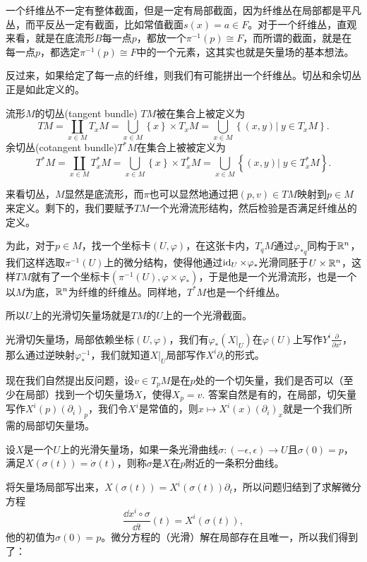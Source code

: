 一个纤维丛不一定有整体截面，但是一定有局部截面，因为纤维丛在局部都是平凡丛，而平反丛一定有截面，比如常值截面$s(x)=a\in F$。对于一个纤维丛，直观来看，就是在底流形$B$每一点$p$，都放一个$\pi^{-1}(p)\cong F$，而所谓的截面，就是在每一点$p$，都选定$\pi^{-1}(p)\cong F$中的一个元素，这其实也就是矢量场的基本想法。

反过来，如果给定了每一点的纤维，则我们有可能拼出一个纤维丛。切丛和余切丛正是如此定义的。

\para 流形$M$的切丛(tangent bundle) $TM$被在集合上被定义为
\[
	TM=\coprod_{x\in M}T_xM=\bigcup_{x\in M} \left\{x\right\}\times T_xM=\bigcup_{x\in M} \left\{(x, y)\vert\; y\in T_xM\right\}.
\]
余切丛(cotangent bundle)$T^*M$在集合上被被定义为
\[
	T^*M=\coprod_{x\in M}T^*_xM=\bigcup_{x\in M} \left\{x\right\}\times T^*_xM=\bigcup_{x\in M} \left\{(x, y)\vert\; y\in T_x^*M\right\}.
\]

\para 来看切丛，$M$显然是底流形，而$\pi$也可以显然地通过把$(p,v)\in TM$映射到$p\in M$来定义。剩下的，我们要赋予$TM$一个光滑流形结构，然后检验是否满足纤维丛的定义。

为此，对于$p\in M$，找一个坐标卡$(U,\varphi)$，在这张卡内，$T_qM$通过$\varphi_{*q}$同构于$\mathbb{R}^n$，我们这样选取$\pi^{-1}(U)$上的微分结构，使得他通过$\operatorname{id}_U\times \varphi_*$光滑同胚于$U \times \mathbb{R}^n$，这样$TM$就有了一个坐标卡$(\pi^{-1}(U),\varphi\times \varphi_*)$，于是他是一个光滑流形，也是一个以$M$为底，$\mathbb{R}^n$为纤维的纤维丛。同样地，$T^*M$也是一个纤维丛。

\para 所以$U$上的光滑切矢量场就是$TM$的$U$上的一个光滑截面。

光滑切矢量场，局部依赖坐标$(U,\varphi)$，我们有$\varphi_*(X|_U)$在$\varphi(U)$上写作$Y^i \frac{\partial}{\partial x^i}$，那么通过逆映射$\varphi_*^{-1}$，我们就知道$X|_U$局部写作$X^i\partial_i$的形式。

现在我们自然提出反问题，设$v\in T_pM$是在$p$处的一个切矢量，我们是否可以（至少在局部）找到一个切矢量场$X$，使得$X_p=v$. 答案自然是有的，在局部，切矢量写作$X^i(p)(\partial_i)_p$，我们令$X^i$是常值的，则$x\mapsto X^i(x)(\partial_i)_x$就是一个我们所需的局部切矢量场。

\para 设$X$是一个$U$上的光滑矢量场，如果一条光滑曲线$\sigma:(-\epsilon,\epsilon)\to U$且$\sigma(0)=p$，满足$X(\sigma(t))=\dot{\sigma}(t)$，则称$\sigma$是$X$在$p$附近的一条积分曲线。

将矢量场局部写出来，$X(\sigma(t))=X^i(\sigma(t))\partial_t$，所以问题归结到了求解微分方程
\[
	\frac{\dd x^i\circ \sigma}{\dd t}(t)=X^i(\sigma(t)),
\]
他的初值为$\sigma(0)=p$。微分方程的（光滑）解在局部存在且唯一，所以我们得到了：

